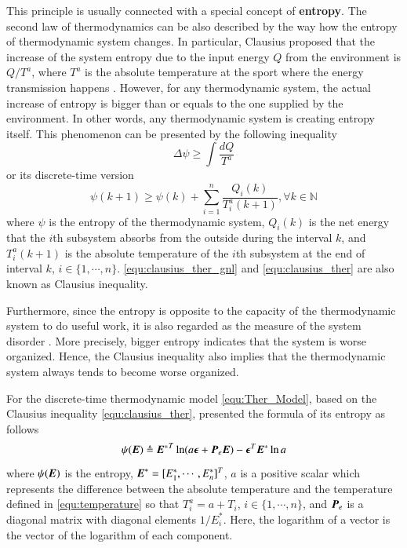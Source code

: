 \documentclass[preprint,authoryear,12pt]{elsarticle}
\renewcommand{\vec}[1]{\mbox{\boldmath$#1$}}
\newcommand{\mat}[1]{\mbox{\boldmath$#1$}}
\begin{document}
This principle is usually connected with a special concept of \textbf{entropy}. The second law of thermodynamics can be also described by the way how the entropy of thermodynamic system changes.
In particular, Clausius proposed that the increase of the system entropy due to the input energy $Q$ from the environment is $Q/T^a$, where $T^a$ is the absolute temperature at the sport where the energy transmission happens \citep{clausius_mechanical_1867}. However, for any thermodynamic system, the actual increase of entropy is bigger than or equals to the one supplied by the environment. In other words, any thermodynamic system is creating entropy itself. This phenomenon can be presented by the following inequality
\begin{equation}\label{equ:clausius_ther_gnl}
\Delta \psi \ge \int\frac{dQ}{T^a}
\end{equation}
or its discrete-time version \citep{haddad_thermodynamic_2005}
\begin{equation}\label{equ:clausius_ther}
\psi(k+1) \ge \psi(k)+\sum_{i=1}^{n}\frac{Q_i(k)}{T^a_i(k+1)},
\forall k\in\mathbb{N}
\end{equation}
where $\psi$ is the entropy of the thermodynamic system, $Q_i(k)$ is the net energy that the $i$th subsystem absorbs from the outside during the interval $k$, and $T^a_i(k+1)$ is the absolute temperature of the $i$th subsystem at the end of interval $k$, $i\in\{1,\cdots,n\}$. \eqref{equ:clausius_ther_gnl} and \eqref{equ:clausius_ther} are also known as Clausius inequality.

 Furthermore, since the entropy is opposite to the capacity of the thermodynamic system to do useful work, it is also regarded as the measure of the system disorder \citep{balmakov_entropy_2001}. More precisely, bigger entropy indicates that the system is worse organized. Hence, the Clausius inequality also implies that the thermodynamic system always tends to become worse organized.

For the discrete-time thermodynamic model \eqref{equ:Ther_Model}, based on the Clausius inequality \eqref{equ:clausius_ther}, \citet{haddad_thermodynamic_2005} presented the formula of its entropy as follows
\begin{equation}
\psi(\vec{E}) \triangleq{\vec{E}^*}^T \ln
(a\vec{\epsilon}+\mat{P}_e\vec{E}) -\vec{\epsilon}^T\vec{E}^*\ln a
\label{equ:Ther_entropy}
\end{equation}
where $\psi(\vec{E})$ is the entropy, $\vec{E}^*=[E^*_1,\cdots,E^*_n]^T$, $a$ is a positive scalar which represents the difference between the absolute temperature and the temperature defined in \eqref{equ:temperature} so that $T^a_i=a+T_i$, $i\in\{1,\cdots,n\}$, and $\mat{P}_e$ is a diagonal matrix with diagonal elements $1/E^*_i$. Here, the logarithm of a vector is the vector of the logarithm of each component.
\end{document}
